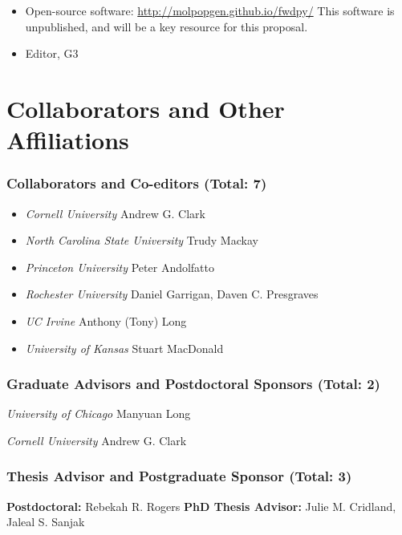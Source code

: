 \begin{itemize} \setlength{\itemsep}{0pt} \setlength{\parskip}{2pt} \setlength{\parsep}{0pt}
\item Open-source software: \url{http://molpopgen.github.io/fwdpy/}  This software is unpublished, and will be a key resource for this proposal.
\item Editor, G3
\end{itemize}

\section{Collaborators and Other Affiliations}
\subsubsection*{Collaborators and Co-editors (Total: 7)}
\begin{itemize}
\item \emph{Cornell University} Andrew G. Clark
\item \emph{North Carolina State University} Trudy Mackay
\item \emph{Princeton University} Peter Andolfatto 
\item \emph{Rochester University} Daniel Garrigan, Daven C. Presgraves
\item \emph{UC Irvine} Anthony (Tony) Long 
\item \emph{University of Kansas} Stuart MacDonald
\end{itemize}

\subsubsection*{Graduate Advisors and Postdoctoral Sponsors (Total: 2)}

\emph{University of Chicago} Manyuan Long

\emph{Cornell University} Andrew G. Clark

\subsubsection*{Thesis Advisor and Postgraduate Sponsor (Total: 3)}
\textbf{Postdoctoral: } Rebekah R. Rogers
\textbf{PhD Thesis Advisor:} Julie M. Cridland, Jaleal S. Sanjak

%

